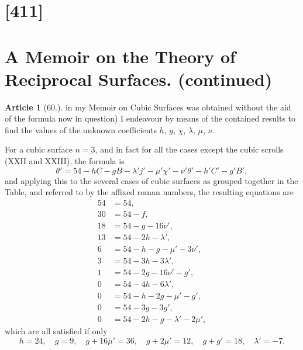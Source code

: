 \documentclass[11pt,a4paper]{article}
\theoremstyle{definition}
\newtheorem{art}{Article}
\begin{document}
\setcounter{page}{351}


\section*{[411]}
\section*{A Memoir on the Theory of Reciprocal Surfaces. (continued)}

\begin{art}[60.]
in my Memoir on Cubic Surfaces was obtained without the aid of the formula now in question) I endeavour by means of the contained results to find the values of the unknown coefficients $h$, $g$, $\chi$, $\lambda$, $\mu$, $\nu$.

For a cubic surface $n = 3$, and in fact for all the cases except the cubic scrolls (XXII and XXIII), the formula is
\[
\theta' = 54 - hC - gB - \lambda' j' - \mu' \chi' - \nu' \theta' - h'C' - g'B',
\]
and applying this to the several cases of cubic surfaces as grouped together in the Table, and referred to by the affixed roman numbers, the resulting equations are
\begin{align*}
54 &= 54, \tag{I} \\
30 &= 54 - f, \tag{II} \\
18 &= 54 - g - 16\nu', \tag{III} \\
13 &= 54 - 2h - \lambda', \tag{IV} \\
6 &= 54 - h - g - \mu' - 3\nu', \tag{VI} \\
3 &= 54 - 3h - 3\lambda', \tag{VIII} \\
1 &= 54 - 2g - 16\nu' - g', \tag{IX} \\
0 &= 54 - 4h - 6\lambda', \tag{XIII} \\
0 &= 54 - h - 2g - \mu' - g', \tag{XVI} \\
0 &= 54 - 3g - 3g', \tag{XVII} \\
0 &= 54 - 2h - g - \lambda' - 2\mu', \tag{XXI}
\end{align*}
which are all satisfied if only
\[
h = 24, \quad g = 9, \quad g + 16\mu' = 36, \quad g + 2\mu' = 12, \quad g + g' = 18, \quad \lambda' = -7.
\]
\end{art}
\end{document}
